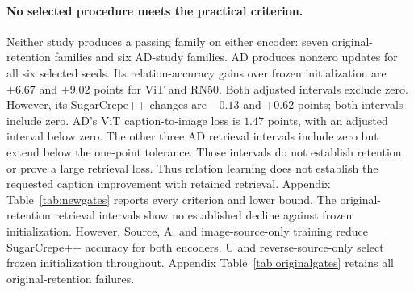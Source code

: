 
\paragraph{No selected procedure meets the practical criterion.}
Neither study produces a passing family on either encoder: seven original-retention families and six AD-study families.
AD produces nonzero updates for all six selected seeds.
Its relation-accuracy gains over frozen initialization are $+6.67$ and $+9.02$ points for ViT and RN50.
Both adjusted intervals exclude zero.
However, its SugarCrepe++ changes are $-0.13$ and $+0.62$ points; both intervals include zero.
AD's ViT caption-to-image loss is $1.47$ points, with an adjusted interval below zero.
The other three AD retrieval intervals include zero but extend below the one-point tolerance.
Those intervals do not establish retention or prove a large retrieval loss.
Thus relation learning does not establish the requested caption improvement with retained retrieval.
Appendix Table~\ref{tab:newgates} reports every criterion and lower bound.
The original-retention retrieval intervals show no established decline against frozen initialization.
However, Source, A, and image-source-only training reduce SugarCrepe++ accuracy for both encoders.
U and reverse-source-only select frozen initialization throughout.
Appendix Table~\ref{tab:originalgates} retains all original-retention failures.
